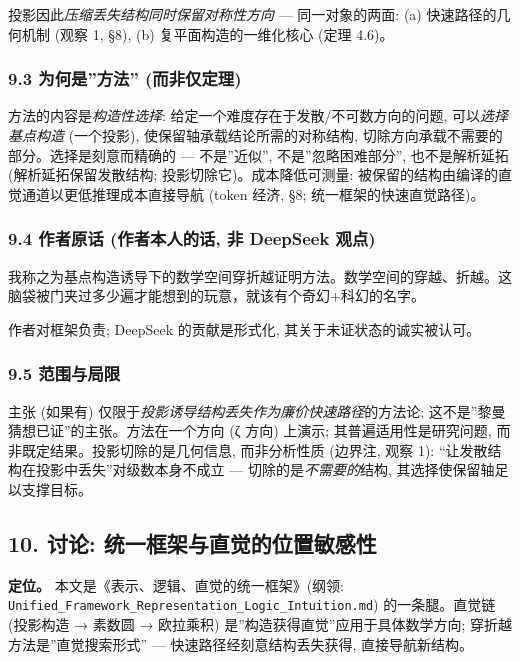 \documentclass[
]{article}
\begin{document}
投影因此\emph{压缩丢失结构同时保留对称性方向} --- 同一对象的两面: (a)
快速路径的几何机制 (观察 1, §8), (b) 复平面构造的一维化核心 (定理 4.6)。

\subsubsection{9.3 为何是''方法''
(而非仅定理)}\label{ux4e3aux4f55ux662fux65b9ux6cd5-ux800cux975eux4ec5ux5b9aux7406}

方法的内容是\emph{构造性选择}: 给定一个难度存在于发散/不可数方向的问题,
可以\emph{选择基点构造} (一个投影), 使保留轴承载结论所需的对称结构,
切除方向承载不需要的部分。选择是刻意而精确的 --- 不是''近似'',
不是''忽略困难部分'', 也不是解析延拓 (解析延拓保留发散结构;
投影切除它)。成本降低可测量:
被保留的结构由编译的直觉通道以更低推理成本直接导航 (token 经济, §8;
统一框架的快速直觉路径)。

\subsubsection{9.4 作者原话 (作者本人的话, 非 DeepSeek
观点)}\label{ux4f5cux8005ux539fux8bdd-ux4f5cux8005ux672cux4ebaux7684ux8bdd-ux975e-deepseek-ux89c2ux70b9}

我称之为基点构造诱导下的数学空间穿折越证明方法。数学空间的穿越、折越。这脑袋被门夹过多少遍才能想到的玩意，就该有个奇幻+科幻的名字。

作者对框架负责; DeepSeek 的贡献是形式化, 其关于未证状态的诚实被认可。

\subsubsection{9.5 范围与局限}\label{ux8303ux56f4ux4e0eux5c40ux9650}

主张 (如果有) 仅限于\emph{投影诱导结构丢失作为廉价快速路径}的方法论;
这不是''黎曼猜想已证''的主张。方法在一个方向 (ζ 方向) 上演示;
其普遍适用性是研究问题, 而非既定结果。投影切除的是几何信息, 而非分析性质
(边界注, 观察 1): ``让发散结构在投影中丢失''对级数本身不成立 ---
切除的是\emph{不需要的}结构, 其选择使保留轴足以支撑目标。

\subsection{10. 讨论:
统一框架与直觉的位置敏感性}\label{ux8ba8ux8bba-ux7edfux4e00ux6846ux67b6ux4e0eux76f4ux89c9ux7684ux4f4dux7f6eux654fux611fux6027}

\textbf{定位。} 本文是《表示、逻辑、直觉的统一框架》(纲领:
\texttt{Unified\_Framework\_Representation\_Logic\_Intuition.md})
的一条腿。直觉链 (投影构造 → 素数圆 → 欧拉乘积)
是''构造获得直觉''应用于具体数学方向; 穿折越方法是''直觉搜索形式'' ---
快速路径经刻意结构丢失获得, 直接导航新结构。
\end{document}
